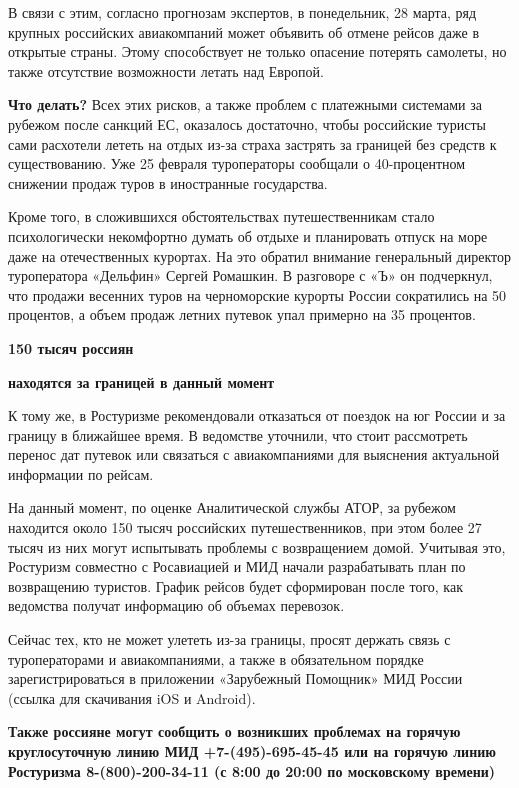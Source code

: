 В связи с этим, согласно прогнозам экспертов, в понедельник, 28 марта, ряд крупных российских авиакомпаний может объявить об отмене рейсов даже в открытые страны. Этому способствует не только опасение потерять самолеты, но также отсутствие возможности летать над Европой.


\textbf{Что делать?} Всех этих рисков, а также проблем с платежными системами за рубежом после санкций ЕС, оказалось достаточно, чтобы российские туристы сами расхотели лететь на отдых из-за страха застрять за границей без средств к существованию. Уже 25 февраля туроператоры сообщали о 40-процентном снижении продаж туров в иностранные государства.

Кроме того, в сложившихся обстоятельствах путешественникам стало психологически некомфортно думать об отдыхе и планировать отпуск на море даже на отечественных курортах. На это обратил внимание генеральный директор туроператора «Дельфин» Сергей Ромашкин. В разговоре с «Ъ» он подчеркнул, что продажи весенних туров на черноморские курорты России сократились на 50 процентов, а объем продаж летних путевок упал примерно на 35 процентов.

\begin{center}
    {\bf \huge 150 тысяч россиян}

    \textbf{находятся за границей в данный момент}
\end{center}

К тому же, в Ростуризме рекомендовали отказаться от поездок на юг России и за границу в ближайшее время. В ведомстве уточнили, что стоит рассмотреть перенос дат путевок или связаться с авиакомпаниями для выяснения актуальной информации по рейсам.

На данный момент, по оценке Аналитической службы АТОР, за рубежом находится около 150 тысяч российских путешественников, при этом более 27 тысяч из них могут испытывать проблемы с возвращением домой. Учитывая это, Ростуризм совместно с Росавиацией и МИД начали разрабатывать план по возвращению туристов. График рейсов будет сформирован после того, как ведомства получат информацию об объемах перевозок.

Сейчас тех, кто не может улететь из-за границы, просят держать связь с туроператорами и авиакомпаниями, а также в обязательном порядке зарегистрироваться в приложении «Зарубежный Помощник» МИД России (ссылка для скачивания iOS и Android).

\begin{center}
    \bf Также россияне могут сообщить о возникших проблемах на горячую круглосуточную линию МИД +7-(495)-695-45-45 или на горячую линию Ростуризма 8-(800)-200-34-11 (с 8:00 до 20:00 по московскому времени)
\end{center}

